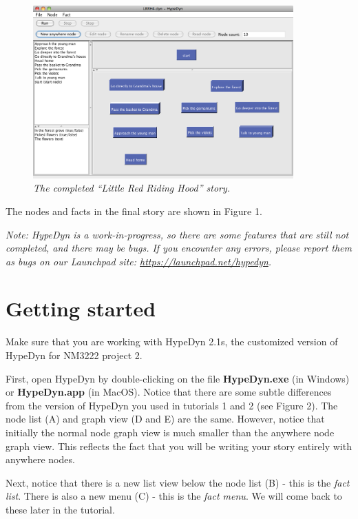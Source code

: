 \documentclass{article}
\begin{document}
\begin{figure}[h]
  \centering
  \includegraphics[width=10cm]{images/hypedyn-tutorial-3-figure-1}
  \caption{\textit{The completed ``Little Red Riding Hood'' story.}}
\end{figure} 

The nodes and facts in the final story are shown in Figure 1.

\textit{Note:  HypeDyn is a work-in-progress, so there are some features that are still
not completed, and there may be bugs. If you encounter any errors, please
report them as bugs on our Launchpad site: \url{https://launchpad.net/hypedyn}.}

\section{Getting started}

Make sure that you are working with HypeDyn 2.1s, the customized version of
HypeDyn for NM3222 project 2.

First, open HypeDyn by double-clicking on the file \textbf{HypeDyn.exe} (in
Windows) or \textbf{HypeDyn.app} (in MacOS). Notice that there are some subtle
differences from the version of HypeDyn you used in tutorials 1 and 2 (see
Figure 2). The node list (A) and graph view (D and E) are the same. However,
notice that initially the normal node graph view is much smaller than the
anywhere node graph view. This reflects the fact that you will be writing your
story entirely with anywhere nodes.

Next, notice that there is a new list view below the node list (B) - this is
the \textit{fact list}. There is also a new menu (C) - this is the \textit{fact
menu}. We will come back to these later in the tutorial.
\end{document}

